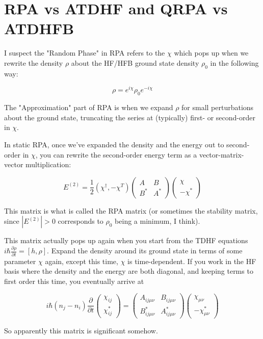 \chapter{RPA vs ATDHF and QRPA vs ATDHFB}

I suspect the "Random Phase" in RPA refers to the $\chi$ which pops up when we rewrite the density $\rho$ about the HF/HFB ground state density $\rho_0$ in the following way:

\begin{equation}
\rho = e^{i\chi} \rho_0 e^{-i\chi}
\end{equation}

\noindent The "Approximation" part of RPA is when we expand $\rho$ for small perturbations about the ground state, truncating the series at (typically) first- or second-order in $\chi$.

In static RPA, once we've expanded the density and the energy out to second-order in $\chi$, you can rewrite the second-order energy term as a vector-matrix-vector multiplication:

\begin{equation}
E^{(2)} = \frac{1}{2}\left(\chi^\dagger, -\chi^T\right) \left(\begin{array}{cc}
A & B \\
B^* & A^*
\end{array}\right) \left(\begin{array}{c}
\chi \\
-\chi^*
\end{array}\right)
\end{equation}

\noindent This matrix is what is called the RPA matrix (or sometimes the stability matrix, since $|E^{(2)}|>0$ corresponds to $\rho_0$ being a minimum, I think).

This matrix actually pops up again when you start from the TDHF equations $i\hbar\frac{\partial\rho}{\partial t} = [h, \rho]$. Expand the density around its ground state in terms of some parameter $\chi$ again, except this time, $\chi$ is time-dependent. If you work in the HF basis where the density and the energy are both diagonal, and keeping terms to first order this time, you eventually arrive at

\begin{equation}
i\hbar(n_j-n_i)\frac{\partial}{\partial t}\left(\begin{array}{c}
\chi_{ij} \\
\chi_{ij}^*
\end{array}\right) = \left(\begin{array}{cc}
A_{ij\mu\nu} & B_{ij\mu\nu} \\
B^*_{ij\mu\nu} & A^*_{ij\mu\nu}
\end{array}\right) \left(\begin{array}{c}
\chi_{\mu\nu} \\
-\chi^*_{\mu\nu}
\end{array}\right)
\end{equation}

So apparently this matrix is significant somehow.